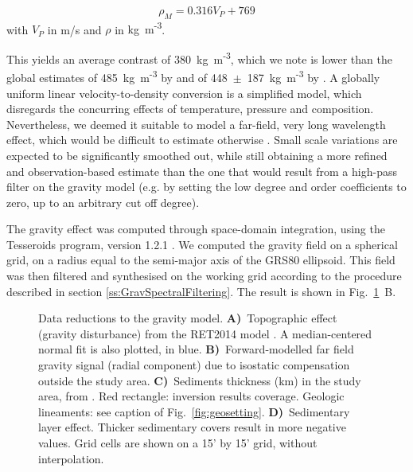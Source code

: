 \begin{equation}
	\label{eq:ACY400}
	\rho_M = 0.316 V_P + 769
\end{equation}
with $V_P$ in m/s and $\rho$ in {kg~m\textsuperscript{-3}}.

This yields an average contrast of 380~{kg~m\textsuperscript{-3}}, which we note is lower than the global estimates of 485~{kg~m\textsuperscript{-3}} by \textcite{Tenzer2012contrast} and of 448~$\pm$~187~{kg~m\textsuperscript{-3}} by \textcite{Sjoberg2011}.
A globally uniform linear velocity-to-density conversion is a simplified model, which disregards the concurring effects of temperature, pressure and composition.
Nevertheless, we deemed it suitable to model a far-field, very long wavelength effect, which would be difficult to estimate otherwise \parencite[for a different approach, based on topography and the Airy-Heiskanen isostatic model, see][]{Grombein2016}.
Small scale variations are expected to be significantly smoothed out, while still obtaining a more refined and observation-based estimate than the one that would result from a high-pass filter on the gravity model (e.g. by setting the low degree and order coefficients to zero, up to an arbitrary cut off degree).

The gravity effect was computed through space-domain integration, using the Tesseroids program, version {1.2.1} \parencites{Uieda2016}{UiedaTesseroids}.
We computed the gravity field on a spherical grid, on a radius equal to the semi-major axis of the {GRS80} ellipsoid.
This field was then filtered and synthesised on the working grid according to the procedure described in section \ref{ss:GravSpectralFiltering}.
The result is shown in Fig.~\ref{fig:g_red}~B.

\begin{figure}
    \begin{adjustbox}{center}
    \end{adjustbox}
	\caption{Data reductions to the gravity model.
	\textbf{A)}~Topographic effect (gravity disturbance) from the {RET2014} model \parencite{Rexer2016}. A median-centered normal fit is also plotted, in blue.
	\textbf{B)}~Forward-modelled far field gravity signal (radial component) due to isostatic compensation outside the study area.
	\textbf{C)}~Sediments thickness (km) in the study area, from \textcite{Tesauro2008}. Red rectangle: inversion results coverage. Geologic lineaments: see caption of Fig.~\ref{fig:geosetting}.
	\textbf{D)}~Sedimentary layer effect. Thicker sedimentary covers result in more negative values.
	Grid cells are shown on a 15' by 15' grid, without interpolation.}
	\label{fig:g_red}
\end{figure}

